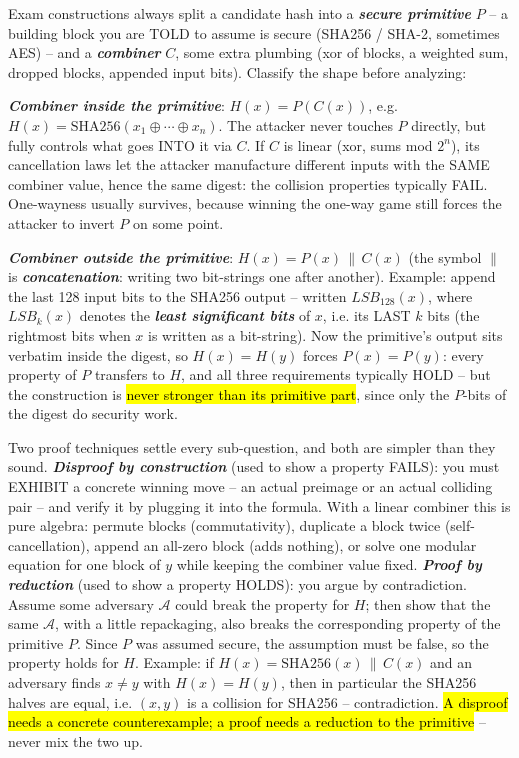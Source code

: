 \documentclass[12pt, a4paper]{article}
\newcommand{\term}[1]{\textbf{\textit{#1}}}        %
\newcommand{\imp}[1]{\hl{#1}}                       %
\begin{document}
Exam constructions always split a candidate hash into a \term{secure primitive} $P$ -- a building block you are TOLD to assume is secure (SHA256 / SHA-2, sometimes AES) -- and a \term{combiner} $C$, some extra plumbing (xor of blocks, a weighted sum, dropped blocks, appended input bits). Classify the shape before analyzing:\begin{tightitem}\item \term{Combiner inside the primitive}: $H(x) = P(C(x))$, e.g. $H(x) = \mathrm{SHA256}(x_1 \oplus \cdots \oplus x_n)$. The attacker never touches $P$ directly, but fully controls what goes INTO it via $C$. If $C$ is linear (xor, sums mod $2^{n}$), its cancellation laws let the attacker manufacture different inputs with the SAME combiner value, hence the same digest: the collision properties typically FAIL. One-wayness usually survives, because winning the one-way game still forces the attacker to invert $P$ on some point.\item \term{Combiner outside the primitive}: $H(x) = P(x) \,\|\, C(x)$ (the symbol $\|$ is \term{concatenation}: writing two bit-strings one after another). Example: append the last 128 input bits to the SHA256 output -- written $LSB_{128}(x)$, where $LSB_{k}(x)$ denotes the \term{least significant bits} of $x$, i.e. its LAST $k$ bits (the rightmost bits when $x$ is written as a bit-string). Now the primitive's output sits verbatim inside the digest, so $H(x) = H(y)$ forces $P(x) = P(y)$: every property of $P$ transfers to $H$, and all three requirements typically HOLD -- but the construction is \imp{never stronger than its primitive part}, since only the $P$-bits of the digest do security work.\end{tightitem}

Two proof techniques settle every sub-question, and both are simpler than they sound. \term{Disproof by construction} (used to show a property FAILS): you must EXHIBIT a concrete winning move -- an actual preimage or an actual colliding pair -- and verify it by plugging it into the formula. With a linear combiner this is pure algebra: permute blocks (commutativity), duplicate a block twice (self-cancellation), append an all-zero block (adds nothing), or solve one modular equation for one block of $y$ while keeping the combiner value fixed. \term{Proof by reduction} (used to show a property HOLDS): you argue by contradiction. Assume some adversary $\mathcal{A}$ could break the property for $H$; then show that the same $\mathcal{A}$, with a little repackaging, also breaks the corresponding property of the primitive $P$. Since $P$ was assumed secure, the assumption must be false, so the property holds for $H$. Example: if $H(x) = \mathrm{SHA256}(x) \,\|\, C(x)$ and an adversary finds $x \neq y$ with $H(x) = H(y)$, then in particular the SHA256 halves are equal, i.e. $(x,y)$ is a collision for SHA256 -- contradiction. \imp{A disproof needs a concrete counterexample; a proof needs a reduction to the primitive} -- never mix the two up.
\end{document}
